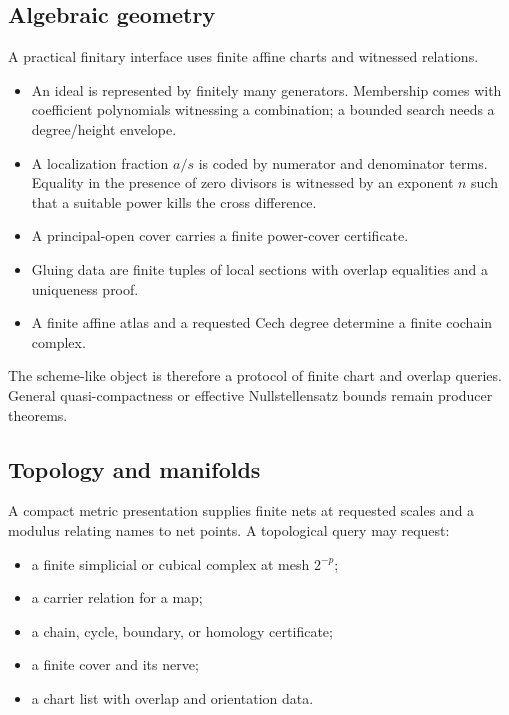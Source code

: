 \subsection{Algebraic geometry}

A practical finitary interface uses finite affine charts and witnessed
relations.

\begin{itemize}
\item An ideal is represented by finitely many generators.  Membership comes
with coefficient polynomials witnessing a combination; a bounded search needs
a degree/height envelope.
\item A localization fraction \(a/s\) is coded by numerator and denominator
terms.  Equality in the presence of zero divisors is witnessed by an exponent
\(n\) such that a suitable power kills the cross difference.
\item A principal-open cover carries a finite power-cover certificate.
\item Gluing data are finite tuples of local sections with overlap equalities
and a uniqueness proof.
\item A finite affine atlas and a requested Cech degree determine a finite
cochain complex.
\end{itemize}

The scheme-like object is therefore a protocol of finite chart and overlap
queries.  General quasi-compactness or effective Nullstellensatz bounds remain
producer theorems.

\subsection{Topology and manifolds}

A compact metric presentation supplies finite nets at requested scales and a
modulus relating names to net points.  A topological query may request:

\begin{itemize}
\item a finite simplicial or cubical complex at mesh \(2^{-p}\);
\item a carrier relation for a map;
\item a chain, cycle, boundary, or homology certificate;
\item a finite cover and its nerve;
\item a chart list with overlap and orientation data.
\end{itemize}

